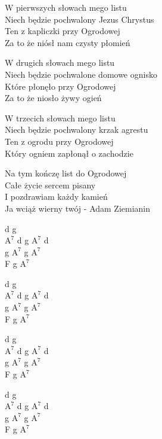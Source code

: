 \begin{text}
    W pierwszych słowach mego listu\\
    Niech będzie pochwalony Jezus Chrystus\\
    Ten z kapliczki przy Ogrodowej\\
    Za to że niósł nam czysty płomień

    W drugich słowach mego listu\\
    Niech będzie pochwalone domowe ognisko\\
    Które płonęło przy Ogrodowej\\
    Za to że niosło żywy ogień

    W trzecich słowach mego listu\\
    Niech będzie pochwalony krzak agrestu\\
    Ten z ogrodu przy Ogrodowej\\
    Który ogniem zapłonął o zachodzie

    Na tym kończę list do Ogrodowej\\
    Całe życie sercem pisany\\
    I pozdrawiam każdy kamień\\
    Ja wciąż wierny twój - Adam Ziemianin
\end{text}
\begin{chord}
    d g\\
    $\mathrm{A^{7}}$ d g $\mathrm{A^{7}}$ d\\
    g $\mathrm{A^{7}}$ g $\mathrm{A^{7}}$\\
    F g $\mathrm{A^{7}}$

    d g\\
    $\mathrm{A^{7}}$ d g $\mathrm{A^{7}}$ d\\
    g $\mathrm{A^{7}}$ g $\mathrm{A^{7}}$\\
    F g $\mathrm{A^{7}}$

    d g\\
    $\mathrm{A^{7}}$ d g $\mathrm{A^{7}}$ d\\
    g $\mathrm{A^{7}}$ g $\mathrm{A^{7}}$\\
    F g $\mathrm{A^{7}}$

    d g\\
    $\mathrm{A^{7}}$ d g $\mathrm{A^{7}}$ d\\
    g $\mathrm{A^{7}}$ g $\mathrm{A^{7}}$\\
    F g $\mathrm{A^{7}}$
\end{chord}
